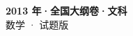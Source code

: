 \documentclass[zihao=-4, a4paper]{ctexart}
\begin{document}
\begin{center}
  {\Large\bfseries 2013 年·全国大纲卷·文科}\\[4pt]
  {\large 数学 · 试题版}
\end{center}
\medskip
{}

\end{document}
